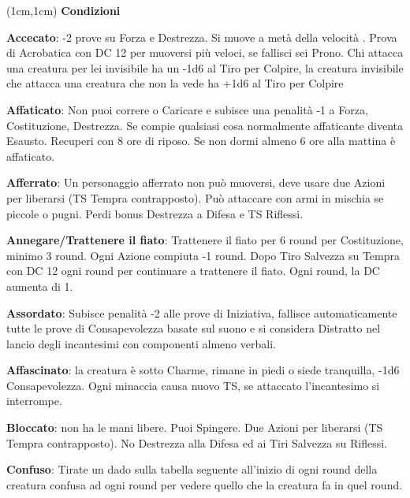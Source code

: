 \documentclass[a4paper,12 pt,openany]{book}
\begin{document}
\center

\footnotesize

\begin{textblock*}{19 cm}(1cm,1cm) %
\flushleft
\textbf{Condizioni}\\

\begin{multicols}{2}

\textbf{Accecato}: -2 prove su Forza e Destrezza.
Si muove a metà della velocità . Prova di Acrobatica con DC 12 per muoversi più veloci, se fallisci sei Prono.
Chi attacca una creatura per lei invisibile ha un -1d6 al Tiro per Colpire, la creatura invisibile che attacca una creatura che non la vede ha +1d6 al Tiro per Colpire

\textbf{Affaticato}: Non puoi correre o Caricare e subisce una penalità -1 a Forza, Costituzione, Destrezza. Se compie qualsiasi cosa normalmente affaticante diventa Esausto.
Recuperi con 8 ore di riposo. Se non dormi almeno 6 ore alla mattina è affaticato.

\textbf{Afferrato}: Un personaggio afferrato non può muoversi, deve usare due Azioni per liberarsi (TS Tempra contrapposto). Può attaccare con armi in mischia se piccole o pugni. Perdi bonus Destrezza a Difesa e TS Riflessi.

\textbf{Annegare/Trattenere il fiato}:  Trattenere il fiato per 6 round per Costituzione, minimo 3 round. Ogni Azione compiuta -1 round. Dopo Tiro Salvezza su Tempra con DC 12 ogni round per continuare a trattenere il fiato. Ogni round, la DC aumenta di 1.

\textbf{Assordato}: Subisce penalità -2 alle prove di Iniziativa, fallisce automaticamente tutte le prove di Consapevolezza basate sul suono e si considera Distratto nel lancio degli incantesimi con componenti almeno verbali.

\textbf{Affascinato}: la creatura è sotto Charme, rimane in piedi o siede tranquilla, -1d6 Consapevolezza. Ogni minaccia causa nuovo TS, se attaccato l'incantesimo si interrompe.

\textbf{Bloccato}: non ha le mani libere. Puoi Spingere. Due Azioni per liberarsi (TS Tempra contrapposto). No Destrezza alla Difesa ed ai Tiri Salvezza su Riflessi.

\textbf{Confuso}:  Tirate un dado sulla tabella seguente all'inizio di ogni round della creatura confusa ad ogni round per vedere quello che la creatura fa in quel round.


\end{multicols}
\end{textblock*}
\end{document}
